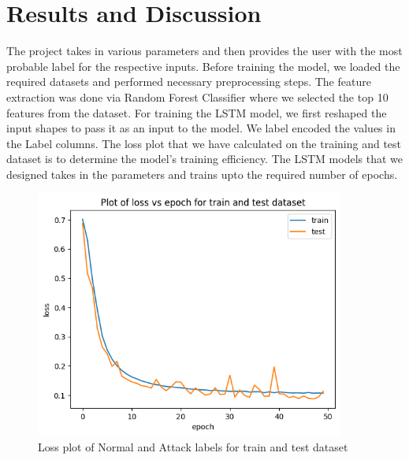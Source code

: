 \chapter{Results and Discussion}
\vspace{-18pt}
The project takes in various parameters and then provides the user with the most probable label for the respective inputs. Before training the model, we loaded the required datasets and performed necessary preprocessing steps. The feature extraction was done via Random Forest Classifier where we selected the top 10 features from the dataset. For training the LSTM model, we first reshaped the input shapes to pass it as an input to the model. We label encoded the values in the Label columns. The loss plot that we have calculated on the training and test dataset is to determine the model's training efficiency. The LSTM models that we designed takes in the parameters and trains upto the required number of epochs.  \par 
\begin{figure}[tbh]
	\begin{center}
		\includegraphics[width=4in]{images/normalvovs.png} 
		\caption{Loss plot of Normal and Attack labels for train and test dataset} %
		\label{Loss plot of Normal and Attack labels for train and test dataset} %
	\end{center}
\end{figure}
